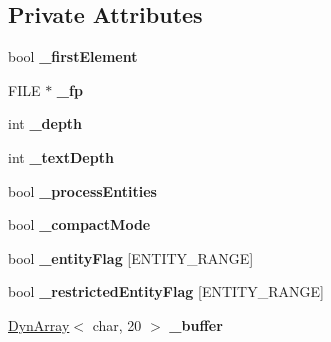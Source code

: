 \subsection*{Private Attributes}
\begin{DoxyCompactItemize}
\item 
bool {\bfseries \+\_\+first\+Element}\hypertarget{classtinyxml2_1_1XMLPrinter_abbd7ac45d97ae5eceec12d6c058119f9}{}\label{classtinyxml2_1_1XMLPrinter_abbd7ac45d97ae5eceec12d6c058119f9}

\item 
F\+I\+LE $\ast$ {\bfseries \+\_\+fp}\hypertarget{classtinyxml2_1_1XMLPrinter_a79d91decf17990f7ce18b592f3fdf44e}{}\label{classtinyxml2_1_1XMLPrinter_a79d91decf17990f7ce18b592f3fdf44e}

\item 
int {\bfseries \+\_\+depth}\hypertarget{classtinyxml2_1_1XMLPrinter_a19cd59a9dbe4b666264803fb91ac8ec1}{}\label{classtinyxml2_1_1XMLPrinter_a19cd59a9dbe4b666264803fb91ac8ec1}

\item 
int {\bfseries \+\_\+text\+Depth}\hypertarget{classtinyxml2_1_1XMLPrinter_a3c5a442e57131faefde97188e92144f3}{}\label{classtinyxml2_1_1XMLPrinter_a3c5a442e57131faefde97188e92144f3}

\item 
bool {\bfseries \+\_\+process\+Entities}\hypertarget{classtinyxml2_1_1XMLPrinter_a3e27c4b4fe791a96e4e139b5034e190b}{}\label{classtinyxml2_1_1XMLPrinter_a3e27c4b4fe791a96e4e139b5034e190b}

\item 
bool {\bfseries \+\_\+compact\+Mode}\hypertarget{classtinyxml2_1_1XMLPrinter_a7bc067aa3f0dcee68e4ac75e19117bd0}{}\label{classtinyxml2_1_1XMLPrinter_a7bc067aa3f0dcee68e4ac75e19117bd0}

\item 
bool {\bfseries \+\_\+entity\+Flag} \mbox{[}E\+N\+T\+I\+T\+Y\+\_\+\+R\+A\+N\+GE\mbox{]}\hypertarget{classtinyxml2_1_1XMLPrinter_a334eb34c43f21daebef9341b4768c275}{}\label{classtinyxml2_1_1XMLPrinter_a334eb34c43f21daebef9341b4768c275}

\item 
bool {\bfseries \+\_\+restricted\+Entity\+Flag} \mbox{[}E\+N\+T\+I\+T\+Y\+\_\+\+R\+A\+N\+GE\mbox{]}\hypertarget{classtinyxml2_1_1XMLPrinter_a5df242509d42ae1c9128924121ebe093}{}\label{classtinyxml2_1_1XMLPrinter_a5df242509d42ae1c9128924121ebe093}

\item 
\hyperlink{classtinyxml2_1_1DynArray}{Dyn\+Array}$<$ char, 20 $>$ {\bfseries \+\_\+buffer}\hypertarget{classtinyxml2_1_1XMLPrinter_a19fca2e934576a892fefe2f602874d59}{}\label{classtinyxml2_1_1XMLPrinter_a19fca2e934576a892fefe2f602874d59}

\end{DoxyCompactItemize}


